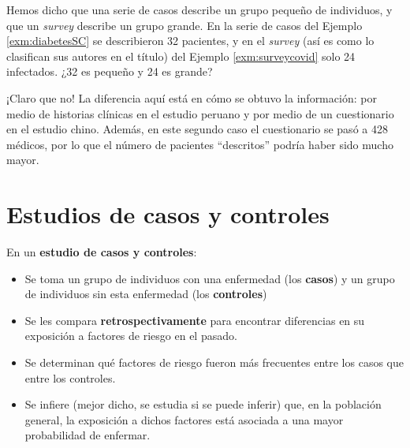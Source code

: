 \documentclass[
]{book}
\theoremstyle{definition}
\theoremstyle{definition}
\theoremstyle{definition}
\theoremstyle{definition}
\theoremstyle{remark}
\begin{document}
\begin{rmdromans}
Hemos dicho que una serie de casos describe un grupo pequeño de individuos, y que un \emph{survey} describe un grupo grande. En la serie de casos del Ejemplo \ref{exm:diabetesSC} se describieron 32 pacientes, y en el \emph{survey} (así es como lo clasifican sus autores en el título) del Ejemplo \ref{exm:surveycovid} solo 24 infectados. ¿32 es pequeño y 24 es grande?

¡Claro que no! La diferencia aquí está en cómo se obtuvo la información: por medio de historias clínicas en el estudio peruano y por medio de un cuestionario en el estudio chino. Además, en este segundo caso el cuestionario se pasó a 428 médicos, por lo que el número de pacientes ``descritos'' podría haber sido mucho mayor.
\end{rmdromans}

\hypertarget{sec:cyc}{%
\section{Estudios de casos y controles}\label{sec:cyc}}

En un \textbf{estudio de casos y controles}:

\begin{itemize}
\item
  Se toma un grupo de individuos con una enfermedad (los \textbf{casos}) y un grupo de individuos sin esta enfermedad (los \textbf{controles})
\item
  Se les compara \textbf{retrospectivamente} para encontrar diferencias en su exposición a factores de riesgo en el pasado.
\item
  Se determinan qué factores de riesgo fueron más frecuentes entre los casos que entre los controles.
\item
  Se infiere (mejor dicho, se estudia si se puede inferir) que, en la población general, la exposición a dichos factores está asociada a una mayor probabilidad de enfermar.
\end{itemize}
\end{document}
